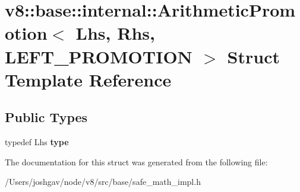 \hypertarget{structv8_1_1base_1_1internal_1_1_arithmetic_promotion_3_01_lhs_00_01_rhs_00_01_l_e_f_t___p_r_o_m_o_t_i_o_n_01_4}{}\section{v8\+:\+:base\+:\+:internal\+:\+:Arithmetic\+Promotion$<$ Lhs, Rhs, L\+E\+F\+T\+\_\+\+P\+R\+O\+M\+O\+T\+I\+ON $>$ Struct Template Reference}
\label{structv8_1_1base_1_1internal_1_1_arithmetic_promotion_3_01_lhs_00_01_rhs_00_01_l_e_f_t___p_r_o_m_o_t_i_o_n_01_4}
\subsection*{Public Types}
\begin{DoxyCompactItemize}
\item 
typedef Lhs {\bfseries type}\hypertarget{structv8_1_1base_1_1internal_1_1_arithmetic_promotion_3_01_lhs_00_01_rhs_00_01_l_e_f_t___p_r_o_m_o_t_i_o_n_01_4_a45b66410f428ca9f1a9b4ae9fe31957c}{}\label{structv8_1_1base_1_1internal_1_1_arithmetic_promotion_3_01_lhs_00_01_rhs_00_01_l_e_f_t___p_r_o_m_o_t_i_o_n_01_4_a45b66410f428ca9f1a9b4ae9fe31957c}

\end{DoxyCompactItemize}


The documentation for this struct was generated from the following file\+:\begin{DoxyCompactItemize}
\item 
/\+Users/joshgav/node/v8/src/base/safe\+\_\+math\+\_\+impl.\+h\end{DoxyCompactItemize}

